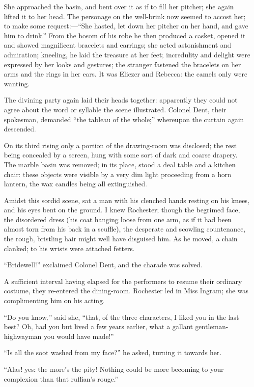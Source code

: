 She approached the basin, and bent over it as if to fill her pitcher;
she again lifted it to her head. The personage on the well-brink now
seemed to accost her; to make some request:---\enquote{She hasted, let
down her pitcher on her hand, and gave him to drink.} From the bosom of
his robe he then produced a casket, opened it and showed magnificent
bracelets and earrings; she acted astonishment and admiration; kneeling,
he laid the treasure at her feet; incredulity and delight were expressed
by her looks and gestures; the stranger fastened the bracelets on her
arms and the rings in her ears. It was Eliezer and Rebecca: the camels
only were wanting.

The divining party again laid their heads together: apparently they
could not agree about the word or syllable the scene illustrated. 
Colonel Dent, their spokesman, demanded \enquote{the tableau of the
whole;} whereupon the curtain again descended.

On its third rising only a portion of the drawing-room was disclosed;
the rest being concealed by a screen, hung with some sort of dark and
coarse drapery. The marble basin was removed; in its place, stood a
deal table and a kitchen chair: these objects were visible by a very dim
light proceeding from a horn lantern, the wax candles being all
extinguished.

Amidst this sordid scene, sat a man with his clenched hands resting on
his knees, and his eyes bent on the ground. I knew \Mr{} Rochester;
though the begrimed face, the disordered dress (his coat hanging loose
from one arm, as if it had been almost torn from his back in a scuffle),
the desperate and scowling countenance, the rough, bristling hair might
well have disguised him. As he moved, a chain clanked; to his wrists
were attached fetters.

\enquote{Bridewell!} exclaimed Colonel Dent, and the charade was solved.

A sufficient interval having elapsed for the performers to resume their
ordinary costume, they re-entered the dining-room. \Mr{} Rochester led in
Miss Ingram; she was complimenting him on his acting.

\enquote{Do you know,} said she, \enquote{that, of the three characters,
I liked you in the last best? Oh, had you but lived a few years
earlier, what a gallant gentleman-highwayman you would have made!}

\enquote{Is all the soot washed from my face?} he asked, turning it
towards her.

\enquote{Alas! yes: the more's the pity! Nothing could be more becoming
to your complexion than that ruffian's rouge.}

